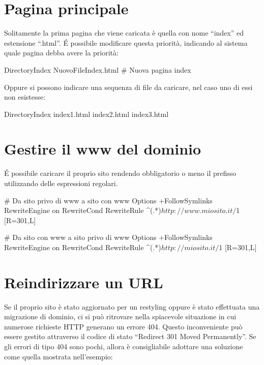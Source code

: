 \section*{Pagina principale}
Solitamente la prima pagina che viene caricata è quella con nome ``index'' ed estensione ``.html''. \'E possibile modificare questa priorità, indicando al sistema quale pagina debba avere la priorità:

\begin{code}
DirectoryIndex NuovoFileIndex.html # Nuova pagina index
\end{code}

Oppure si possono indicare una sequenza di file da caricare, nel caso uno di essi non esistesse:

\begin{code}
DirectoryIndex index1.html index2.html index3.html 
\end{code}

\section*{Gestire il www del dominio}
\'E possibile caricare il proprio sito rendendo obbligatorio o meno il prefisso  utilizzando delle espressioni regolari.

\begin{code}
# Da sito privo di www a sito con www
Options +FollowSymlinks
RewriteEngine on
RewriteCond %
RewriteRule ^(.*)$ http://www.miosito.it/$1 [R=301,L]
\end{code}

\begin{code}
# Da sito con www a sito privo di www
Options +FollowSymlinks
RewriteEngine on
RewriteCond %
RewriteRule ^(.*)$ http://miosito.it/$1 [R=301,L]
\end{code}

\section*{Reindirizzare un URL}
Se il proprio sito è stato aggiornato per un restyling oppure è stato effettuata una migrazione di dominio, ci si può ritrovare nella spiacevole situazione in cui numerose richieste \ac{HTTP} generano un errore 404. Questo inconveniente può essere gestito attraverso il codice di stato ``Redirect 301 Moved Permanently''. Se gli errori di tipo 404 sono pochi, allora è consigliabile adottare una soluzione come quella mostrata nell'esempio:

